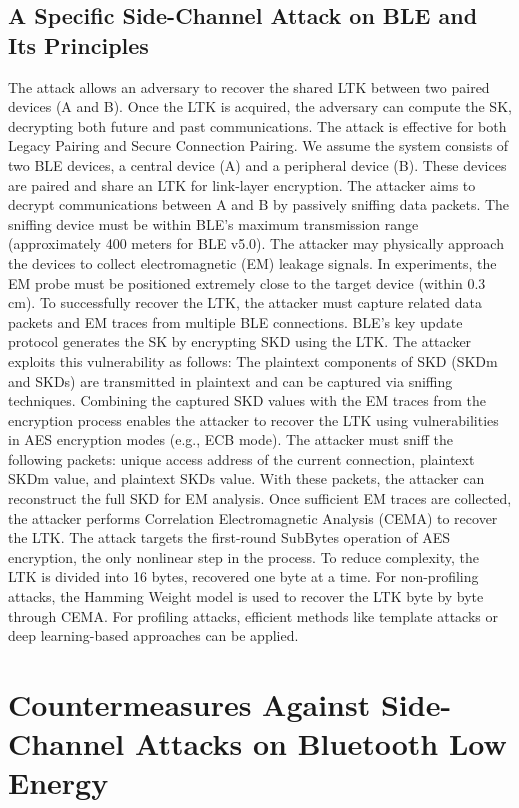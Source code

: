 \documentclass{article}
\begin{document}
\subsection{A Specific Side-Channel Attack on BLE and Its Principles}
The attack allows an adversary to recover the shared LTK between two paired devices (A and B). Once the LTK is acquired, the adversary can compute the SK, decrypting both future and past communications. The attack is effective for both Legacy Pairing and Secure Connection Pairing.
We assume the system consists of two BLE devices, a central device (A) and a peripheral device (B). These devices are paired and share an LTK for link-layer encryption. The attacker aims to decrypt communications between A and B by passively sniffing data packets. The sniffing device must be within BLE's maximum transmission range (approximately 400 meters for BLE v5.0). The attacker may physically approach the devices to collect electromagnetic (EM) leakage signals. In experiments, the EM probe must be positioned extremely close to the target device (within 0.3 cm). To successfully recover the LTK, the attacker must capture related data packets and EM traces from multiple BLE connections.
BLE’s key update protocol generates the SK by encrypting SKD using the LTK. The attacker exploits this vulnerability as follows: The plaintext components of SKD (SKDm and SKDs) are transmitted in plaintext and can be captured via sniffing techniques. Combining the captured SKD values with the EM traces from the encryption process enables the attacker to recover the LTK using vulnerabilities in AES encryption modes (e.g., ECB mode). The attacker must sniff the following packets: unique access address of the current connection, plaintext SKDm value, and plaintext SKDs value. With these packets, the attacker can reconstruct the full SKD for EM analysis. Once sufficient EM traces are collected, the attacker performs Correlation Electromagnetic Analysis (CEMA) to recover the LTK. The attack targets the first-round SubBytes operation of AES encryption, the only nonlinear step in the process. To reduce complexity, the LTK is divided into 16 bytes, recovered one byte at a time. For non-profiling attacks, the Hamming Weight model is used to recover the LTK byte by byte through CEMA. For profiling attacks, efficient methods like template attacks or deep learning-based approaches can be applied.
\section{Countermeasures Against Side-Channel Attacks on Bluetooth Low Energy}
\end{document}
